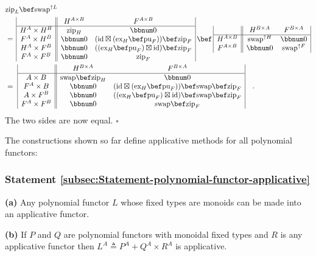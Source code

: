 \begin{align*}
 & \text{zip}_{L}\bef\text{swap}^{\uparrow L}\\
 & =\,\begin{array}{|c||cc|}
 & H^{A\times B} & F^{A\times B}\\
\hline H^{A}\times H^{B} & \text{zip}_{H} & \bbnum 0\\
F^{A}\times H^{B} & \bbnum 0 & (\text{id}\boxtimes(\text{ex}_{H}\bef\text{pu}_{F}))\bef\text{zip}_{F}\\
H^{A}\times F^{B} & \bbnum 0 & ((\text{ex}_{H}\bef\text{pu}_{F})\boxtimes\text{id})\bef\text{zip}_{F}\\
F^{A}\times F^{B} & \bbnum 0 & \text{zip}_{F}
\end{array}\,\bef\,\begin{array}{|c||cc|}
 & H^{B\times A} & F^{B\times A}\\
\hline H^{A\times B} & \text{swap}^{\uparrow H} & \bbnum 0\\
F^{A\times B} & \bbnum 0 & \text{swap}^{\uparrow F}
\end{array}\\
 & =\,\,\begin{array}{|c||cc|}
 & H^{B\times A} & F^{B\times A}\\
\hline A\times B & \text{swap}\bef\text{zip}_{H} & \bbnum 0\\
F^{A}\times B & \bbnum 0 & (\text{id}\boxtimes(\text{ex}_{H}\bef\text{pu}_{F}))\bef\text{swap}\bef\text{zip}_{F}\\
A\times F^{B} & \bbnum 0 & ((\text{ex}_{H}\bef\text{pu}_{F})\boxtimes\text{id})\bef\text{swap}\bef\text{zip}_{F}\\
F^{A}\times F^{B} & \bbnum 0 & \text{swap}\bef\text{zip}_{F}
\end{array}\quad.
\end{align*}
The two sides are now equal. $\square$

The constructions shown so far define applicative methods for all
polynomial functors:

\subsubsection{Statement \label{subsec:Statement-polynomial-functor-applicative}\ref{subsec:Statement-polynomial-functor-applicative}}

\textbf{(a)} Any polynomial functor $L$ whose fixed types are monoids
can be made into an applicative functor. 

\textbf{(b)} If $P$ and $Q$ are polynomial functors with monoidal
fixed types and $R$ is any applicative functor then $L^{A}\triangleq P^{A}+Q^{A}\times R^{A}$
is applicative.

